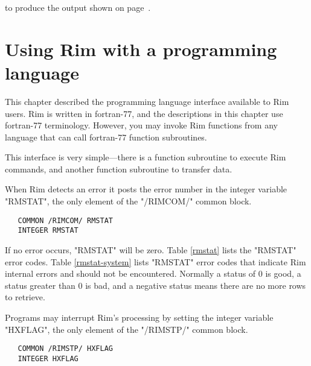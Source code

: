 to produce the output shown on page~\pageref{while-rpt}.
 
 
 
 
%
%
 
\chapter{Using Rim with a programming language}
%
\label{pi-chapter}
This chapter described the programming language interface
available to Rim users.
Rim is written in fortran-77, and the descriptions in this
chapter use fortran-77 terminology.  However, you may
invoke Rim functions from any language that can
call fortran-77 function subroutines.
 
This interface is very simple---there is a function subroutine
to execute Rim commands, and another function subroutine
to transfer data.
 
 
When Rim detects an error it posts the error number in
the integer variable "RMSTAT", the only element
of the "/RIMCOM/" common block.
 
\code\begin{verbatim}
   COMMON /RIMCOM/ RMSTAT
   INTEGER RMSTAT
\end{verbatim}\endcode
 
If no error occurs, "RMSTAT" will be zero.
Table \ref{rmstat} lists the "RMSTAT" error codes.
Table \ref{rmstat-system} lists "RMSTAT" error codes that
indicate Rim internal errors and should not be encountered.
Normally a status of 0 is good, a status greater than 0 is bad, and
a negative status means there are no more rows to retrieve.
 
 
Programs may interrupt Rim's processing by setting
the integer variable "HXFLAG", the only element
of the "/RIMSTP/" common block.
 
\code\begin{verbatim}
   COMMON /RIMSTP/ HXFLAG
   INTEGER HXFLAG
\end{verbatim}\endcode
 
